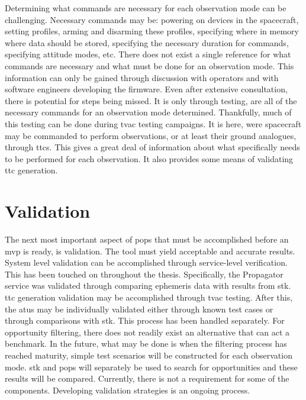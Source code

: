 Determining what commands are necessary for each observation mode can be
challenging.  Necessary commands may be: powering on devices in the spacecraft,
setting profiles, arming and disarming these profiles, specifying where in
memory where data should be stored, specifying the necessary duration for
commands, specifying attitude modes, etc.  There does not exist a single
reference for what commands are necessary and what must be done for an
observation mode. This information can only be gained through discussion with
operators and with software engineers developing the firmware.  Even after
extensive consultation, there is potential for steps being missed. It is only
through testing, are all of the necessary commands for an observation mode
determined.  Thankfully, much of this testing can be done during \gls{tvac}
testing campaigns. It is here, were spacecraft may be commanded to perform
observations, or at least their ground analogues, through \glspl{ttc}.  This
gives a great deal of information about what specifically needs to be performed
for each observation. It also provides some means of validating \gls{ttc}
generation.


\section{Validation}

The next most important aspect of \gls{pops} that must be accomplished before
an \gls{mvp} is ready, is validation. The tool must yield acceptable and
accurate results. System level validation can be accomplished through
service-level verification. This has been touched on throughout the thesis.
Specifically, the Propagator service was validated through comparing ephemeris
data with results from \gls{stk}. \gls{ttc} generation validation may be
accomplished through \gls{tvac} testing. After this, the \glspl{atu} may be
individually validated either through known test cases or through comparisons
with \gls{stk}. This process has been handled separately.  For opportunity
filtering, there does not readily exist an alternative that can act a
benchmark. In the future, what may be done is when the filtering process has
reached maturity, simple test scenarios will be constructed for each
observation mode.  \gls{stk} and \gls{pops} will separately be used to search
for opportunities and these results will be compared. Currently, there is not a
requirement for some of the components. Developing validation strategies is an
ongoing process.

 
